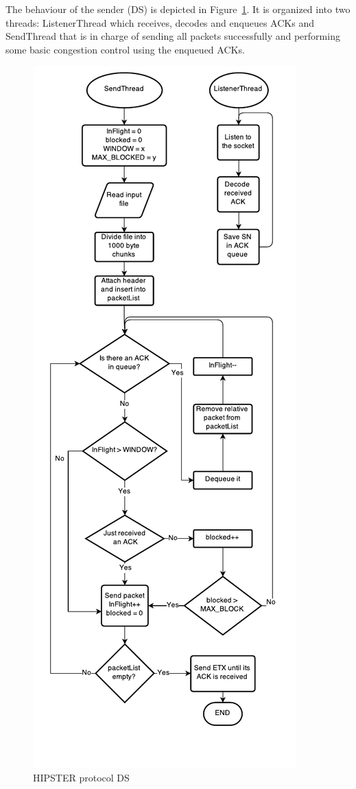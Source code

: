 \documentclass[10pt,twocolumn]{article}
\begin{document}
The behaviour of the sender (DS) is depicted in Figure~\ref{fig:senderFlow}.
It is organized into two threads: ListenerThread which receives, decodes and
enqueues ACKs and SendThread that is in charge of sending all packets
successfully and performing some basic congestion control using the enqueued
ACKs.
\begin{figure}[htp]
	\centering
	\includegraphics[height=0.75\textheight]{Documentation/Sender.pdf}
	\caption{HIPSTER protocol DS}
	\label{fig:senderFlow}
\end{figure}
\end{document}

